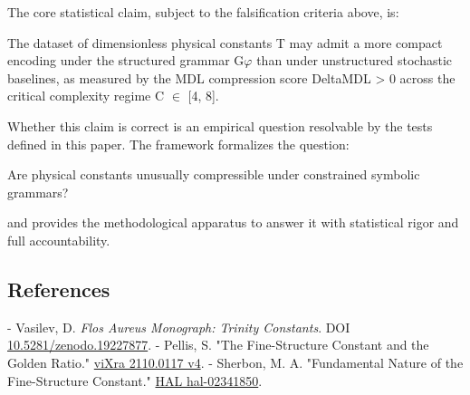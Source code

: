   The core statistical claim, subject to the falsification criteria above, is:

          The dataset of dimensionless physical constants T may admit a more compact
          encoding under the structured grammar G$\varphi$ than under unstructured stochastic
          baselines, as measured by the MDL compression score DeltaMDL > 0 across the
          critical complexity regime C $\in$ [4, 8].

  Whether this claim is correct is an empirical question resolvable by the tests defined in
  this paper. The framework formalizes the question:

  Are physical constants unusually compressible under constrained symbolic grammars?

  and provides the methodological apparatus to answer it with statistical rigor and full
  accountability.

\subsection{References}

- Vasilev, D. \textit{Flos Aureus Monograph: Trinity Constants}. DOI \href{https://zenodo.org/doi/10.5281/zenodo.19227877}{10.5281/zenodo.19227877}.
- Pellis, S. "The Fine-Structure Constant and the Golden Ratio." \href{https://vixra.org/pdf/2110.0117v4.pdf}{viXra 2110.0117 v4}.
- Sherbon, M. A. "Fundamental Nature of the Fine-Structure Constant." \href{https://hal.science/hal-02341850/document}{HAL hal-02341850}.

